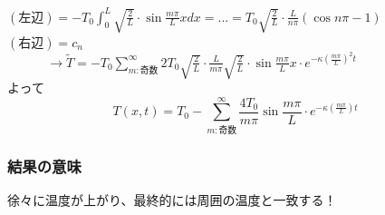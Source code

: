 \documentclass[titlepage,dvipdfmx]{jsarticle}
\begin{document}
$\displaystyle (左辺)=-T_0 \int_{0}^{L}\sqrt{\frac{2}{L}}\cdot \sin \frac{m\pi}{L}x dx=...=T_0 \sqrt{\frac{2}{L}}\cdot \frac{L}{n\pi}\left( \cos n\pi -1 \right)$\\
$\displaystyle (右辺)=c_n$\\
$~~\displaystyle ~~~~~~~~~~~~\rightarrow \widetilde{T}=-T_0 \sum_{m:奇数}^{\infty} 2T_0 \sqrt{\frac{2}{L}}\cdot \frac{L}{m\pi}\sqrt{\frac{2}{L}}\cdot \sin \frac{m\pi}{L}x \cdot e^{-\kappa \left(\frac{m\pi}{L}\right)^2 t}$\\
よって\\
\begin{equation}
\displaystyle
T(x,t)=T_0-\sum_{m:奇数}^{\infty} \frac {4T_0}{m\pi} \sin{\frac{m\pi}{L}}\cdot e^{-\kappa \left(\frac{m\pi}{L}\right)t}
\nonumber
\end{equation}
\subsubsection*{結果の意味}
徐々に温度が上がり、最終的には周囲の温度と一致する！
\end{document}

